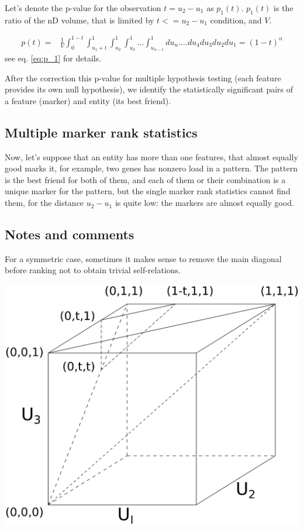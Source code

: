 \documentclass{llncs}
\begin{document}
Let's denote the p-value for the observation $t=u_2-u_1$ as $p_1(t)$. $p_1(t)$ is the ratio of the nD volume, that is limited by $t<=u_2-u_1$ condition, and $V$.

\begin{eqnarray*}
p(t) = & \displaystyle\frac{1}{V} \displaystyle \int_0^{1-t}\int_{{u_1}+t}^1\int_{u_2}^1\int_{u_3}^1...\int_{u_{n-1}}^1 du_n....du_4 du_3 du_2 du_1 = (1-t)^n
\end{eqnarray*}
see eq. \ref{eq:p_1} for details.

After the correction this p-value for multiple hypothesis testing (each feature provides its own null hypothesis), we identify the statistically significant pairs of a feature (marker) and entity (its best friend).

\subsection{Multiple marker rank statistics}
Now, let's suppose that an entity has more than one features, that almost equally good marks it, for example, two genes has nonzero load in a pattern. The pattern is the best friend for both of them, and each of them or their combination is a unique marker for the pattern, but the single marker rank statistics cannot find them, for the distance $u_2-u_1$ is quite low: the markers are almost equally good.

\subsection*{Notes and comments}

For a symmetric case, sometimes it makes sense to remove the main diagonal before ranking not to obtain trivial self-relations.

\includegraphics[scale=.5,trim=0 10cm 0 0, clip=true]{rank3d-nocolour}
\end{document}
